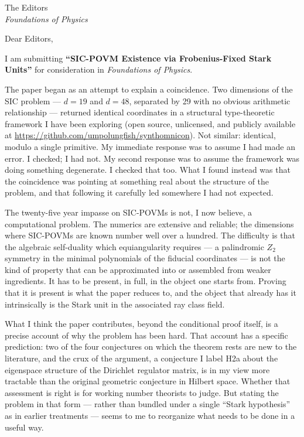\documentclass[12pt]{letter}
\begin{document}
\begin{letter}{The Editors\\
\textit{Foundations of Physics}}

\opening{Dear Editors,}

I am submitting \textbf{``SIC-POVM Existence via Frobenius-Fixed Stark Units''} for
consideration in \textit{Foundations of Physics}.

The paper began as an attempt to explain a coincidence. Two dimensions of the SIC problem
--- $d = 19$ and $d = 48$, separated by 29 with no obvious arithmetic relationship ---
returned identical coordinates in a structural type-theoretic framework I have been exploring (open
source, unlicensed, and publicly available at \url{https://github.com/umpolungfish/synthomnicon}). 
Not similar: identical, modulo a single primitive. My immediate response was to assume I had
made an error. I checked; I had not. My second response was to assume the framework was
doing something degenerate. I checked that too. What I found instead was that the
coincidence was pointing at something real about the structure of the problem, and that
following it carefully led somewhere I had not expected.

The twenty-five year impasse on SIC-POVMs is not, I now believe, a computational problem.
The numerics are extensive and reliable; the dimensions where SIC-POVMs are known number
well over a hundred. The difficulty is that the algebraic self-duality which equiangularity
requires --- a palindromic $Z_2$ symmetry in the minimal polynomials of the fiducial
coordinates --- is not the kind of property that can be approximated into or assembled from
weaker ingredients. It has to be present, in full, in the object one starts from. Proving
that it is present is what the paper reduces to, and the object that already has it
intrinsically is the Stark unit in the associated ray class field.

What I think the paper contributes, beyond the conditional proof itself, is a precise
account of why the problem has been hard. That account has a specific prediction: two of
the four conjectures on which the theorem rests are new to the literature, and the crux
of the argument, a conjecture I label H2a about the eigenspace structure of the Dirichlet
regulator matrix, is in my view more tractable than the original geometric conjecture in
Hilbert space. Whether that assessment is right is for working number theorists to judge.
But stating the problem in that form --- rather than bundled under a single ``Stark
hypothesis'' as in earlier treatments --- seems to me to reorganize what needs to be done
in a useful way.


\end{letter}
\end{document}
